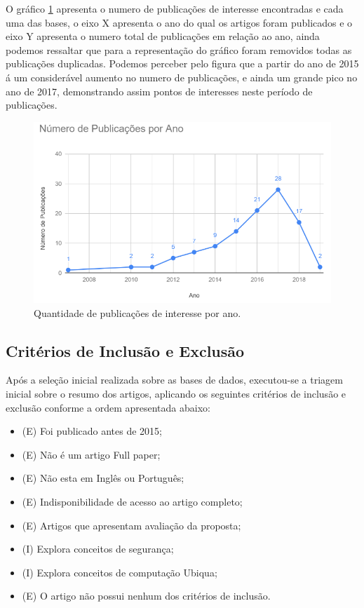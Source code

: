 \documentclass[tid,table]{texufpel} %
\begin{document}
O gráfico \ref{fig:grafPublicaAno} apresenta o numero de publicações de interesse encontradas e cada uma das bases, o eixo X apresenta o ano do qual os artigos foram publicados e o eixo Y apresenta o numero total de publicações em relação ao ano, ainda podemos ressaltar que para a representação do gráfico foram removidos todas as publicações duplicadas. Podemos perceber pelo figura que a partir do ano de 2015 á um considerável aumento no numero de publicações, e ainda um grande pico no ano de 2017, demonstrando assim pontos de interesses neste período de publicações.

\begin{figure}[ht]
	\centering
	\includegraphics[width=.9\textwidth]{imagens/grafPublicaAno.png}
	\caption{Quantidade de publicações de interesse por ano.}
	\label{fig:grafPublicaAno}
\end{figure}

\subsection{Critérios de Inclusão e Exclusão}
Após a seleção inicial realizada sobre as bases de dados, executou-se a triagem inicial sobre o resumo dos artigos, aplicando os seguintes critérios de inclusão e exclusão conforme a ordem apresentada abaixo: 
\begin{itemize}
	\item (E) Foi publicado antes de 2015;
	\item (E) Não é um artigo Full paper;
	\item (E) Não esta em Inglês ou Português;
	\item (E) Indisponibilidade de acesso ao artigo completo;
	\item (E) Artigos que apresentam avaliação da proposta;
	\item (I) Explora conceitos de segurança;
	\item (I) Explora conceitos de computação Ubiqua;
	\item (E) O artigo não possui nenhum dos critérios de inclusão.
\end{itemize}
	
\end{document}
